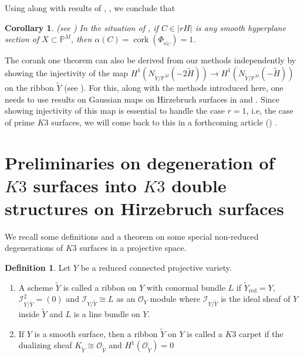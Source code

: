 \documentclass[11pt,twoside]{amsart}
\theoremstyle{plain}
\numberwithin{equation}{section}
\newtheorem{corollary}[theorem]{Corollary}
\theoremstyle{definition}
\newtheorem{definition}[theorem]{Definition}
\begin{document}
\vspace{0.2cm}

\par

Using  along with results of \cite{CDS20}, \cite{ABS17}, we conclude that 

\begin{corollary}\label{corank one intro}(see )
In the situation of , if $C \in |rH|$ is any smooth hyperplane section of $X \subset \mathbb{P}^M$, then $\alpha(C) = \operatorname{cork}(\Phi_{\omega_C}) = 1$.   
\end{corollary}

The corank one theorem can also be derived from our methods  independently by showing the injectivity of the map $H^1(N_{\widetilde{Y}/\mathbb{P}^M}(-2\widetilde{H})) \to H^1(N_{\widetilde{Y}/\mathbb{P}^M}(-\widetilde{H}))$ on the ribbon $\widetilde{Y}$ (see  ). For this, along with the methods introduced here, one needs to use results on Gaussian maps on Hirzebruch surfaces in \cite{DM92} and \cite{DP12}. Since showing injectivity of this map is essential to handle the case $r = 1$, i.e, the case of prime $K3$ surfaces, we will come back to this in a forthcoming article (\cite{BM25}) . 



\section{Preliminaries on degeneration of $K3$ surfaces into $K3$ double structures on Hirzebruch surfaces}

We recall some definitions and a theorem on some special non-reduced degenerations of $K3$ surfaces in a projective space.

\begin{definition}\label{ribbon}
Let $Y$ be a reduced connected projective variety.
 \begin{enumerate}
     \item A scheme $\widetilde{Y}$ is called a ribbon on $Y$ with conormal bundle $L$ if $\widetilde{Y}_{\operatorname{red}} = Y$, $\mathcal{I}_{Y/\widetilde{Y}}^2 = (0)$ and $\mathcal{I}_{Y/\widetilde{Y}} \cong L$ as an $\mathcal{O}_Y$ module where $\mathcal{I}_{Y/\widetilde{Y}}$ is the ideal sheaf of $Y$ inside $\widetilde{Y}$ and $L$ is a line bundle on $Y$. 

     \item If $Y$ is a smooth surface, then a ribbon $\widetilde{Y}$ on $Y$ is called a $K3$ carpet if the dualizing sheaf $K_{\widetilde{Y}} \cong \mathcal{O}_{\widetilde{Y}}$ and $H^1(\mathcal{O}_{\widetilde{Y}})= 0$

\end{enumerate}
\end{definition}  
\end{document}
